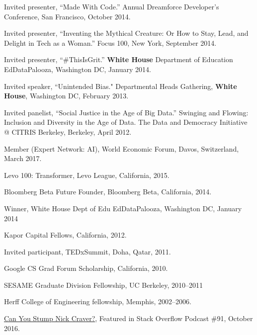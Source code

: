 \documentclass[11pt,article,oneside]{memoir}
\begin{document}
\ind Invited presenter, ``Made With Code.'' Annual Dreamforce Developer's Conference, San Francisco, October 2014.

\ind Invited presenter, ``Inventing the Mythical Creature: Or How to Stay, Lead, and Delight in Tech as a Woman.'' Focus 100, New York, September 2014.

\ind Invited presenter, ``\#ThisIsGrit.'' \textbf{White House} Department of Education EdDataPalooza, Washington DC, January 2014.

\ind Invited speaker, ``Unintended Bias." Departmental Heads Gathering, \textbf{White House}, Washington DC, February 2013.

\ind Invited panelist, ``Social Justice in the Age of Big Data.'' Swinging and Flowing: Inclusion and Diversity in the Age of Data. The Data and Democracy Initiative @ CITRIS Berkeley, Berkeley, April 2012.

\bigskip

\medskip

\ind Member (Expert Network: AI), World Economic Forum, Davos, Switzerland, March 2017.

\ind Levo 100: Transformer, Levo League, California, 2015.

\ind Bloomberg Beta Future Founder, Bloomberg Beta, California, 2014.

\ind Winner, White House Dept of Edu EdDataPalooza, Washington DC, January 2014

\ind Kapor Capital Fellows, California, 2012.

\ind Invited participant, TEDxSummit, Doha, Qatar, 2011.

\ind Google CS Grad Forum Scholarship, California, 2010.

\ind SESAME Graduate Division Fellowship, UC Berkeley, 2010--2011

\ind Herff College of Engineering fellowship, Memphis, 2002--2006.

\bigskip

\medskip

\ind \href{https://soundcloud.com/stack-exchange/stack-overflow-podcast-91-can-you-stump-nick-craver}{Can You Stump Nick Craver?}, Featured in Stack Overflow Podcast \#91, October 2016.
\end{document}
